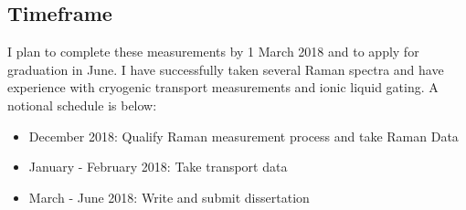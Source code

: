 \documentclass[11pt]{article}
\begin{document}
\begin{multicols}{2}
\begin{comment}
\end{comment}


\section{Timeframe}
I plan to complete these measurements by 1 March 2018 and to apply for graduation in June. I have successfully taken several Raman spectra and have experience with cryogenic transport measurements and ionic liquid gating. A notional schedule is below:

\begin{itemize}
	\item December 2018: Qualify Raman measurement process and take Raman Data
	\item January - February 2018: Take transport data 
	\item March - June 2018: Write and submit dissertation
\end{itemize}




\end{multicols}
\end{document}
